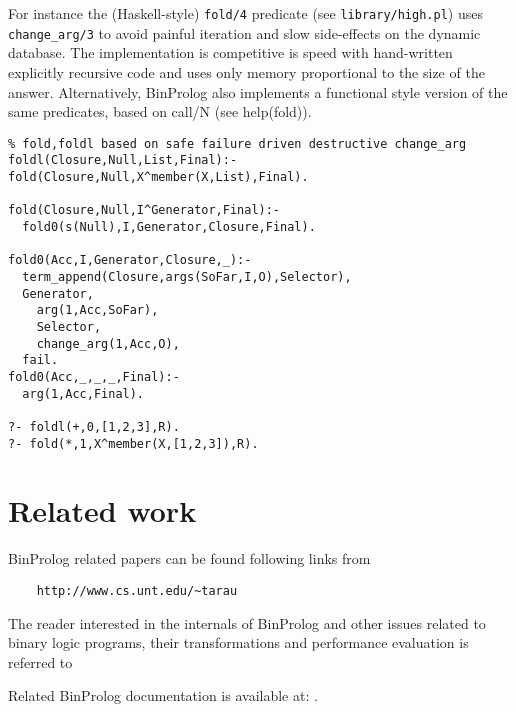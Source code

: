 \documentclass{article}
\begin{document}
For instance the (Haskell-style) {\tt fold/4} predicate 
(see {\tt library/high.pl}) uses {\tt change\_arg/3}  to avoid painful
iteration and slow side-effects on the dynamic database.
The implementation is competitive is speed
with hand-written explicitly recursive code and uses
only memory proportional to the size of the answer.
Alternatively, BinProlog  also implements a functional style
version of the same predicates, based on call/N (see help(fold)).

\begin{verbatim}
% fold,foldl based on safe failure driven destructive change_arg
foldl(Closure,Null,List,Final):-fold(Closure,Null,X^member(X,List),Final).

fold(Closure,Null,I^Generator,Final):-
  fold0(s(Null),I,Generator,Closure,Final).

fold0(Acc,I,Generator,Closure,_):-
  term_append(Closure,args(SoFar,I,O),Selector),
  Generator,
    arg(1,Acc,SoFar),
    Selector,
    change_arg(1,Acc,O),
  fail.
fold0(Acc,_,_,_,Final):-
  arg(1,Acc,Final).

?- foldl(+,0,[1,2,3],R).
?- fold(*,1,X^member(X,[1,2,3]),R).
\end{verbatim}


\section{Related work}

BinProlog related papers can be found following links from
\begin{verbatim}
    http://www.cs.unt.edu/~tarau
\end{verbatim}

{\flushleft The reader} interested in the internals of BinProlog and other
issues related to binary logic programs, their transformations
and performance evaluation is referred to
\cite{Tarau90:PLILP,Tarau91:JAP,Tarau91:RU,Demoen90:KUL,Demoen91:RU,Tarau92:WAMOpt,Tarau92:ECO,LOPSTR93:Neumerkel,Neum92,Tarau93:GULP,Tarau93a,kdb93f,WA83,lindgren,TD94:WE,TA94:JFPL,TN94:PLILP,pt93b,kdb93j,kdb93d,Demoen96:GC,TarauDF95,dbt95a,DPT96:PAP,TDF:asian96,lpnet96:virtual,tdb95rev}

Related BinProlog documentation is available at: 
\cite{bp7user,bp7advanced,bp7interface,bp7crossref}.



%
\end{document}
